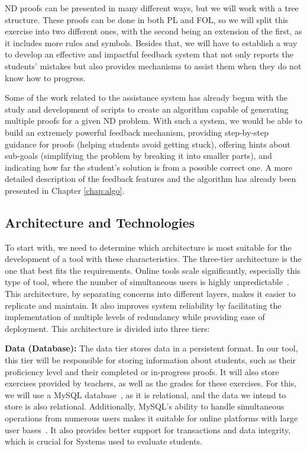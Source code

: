 \gls{ND} proofs can be presented in many different ways, but we will work with a tree structure. These proofs can be done in both \gls{PL} and \gls{FOL}, so we will split this exercise into two different ones, with the second being an extension of the first, as it includes more rules and symbols. Besides that, we will have to establish a way to develop an effective and impactful feedback system that not only reports the students' mistakes but also provides mechanisms to assist them when they do not know how to progress. 

Some of the work related to the assistance system has already begun with the study and development of scripts to create an algorithm capable of generating multiple proofs for a given \gls{ND} problem. With such a system, we would be able to build an extremely powerful feedback mechanism, providing step-by-step guidance for proofs (helping students avoid getting stuck), offering hints about sub-goals (simplifying the problem by breaking it into smaller parts), and indicating how far the student's solution is from a possible correct one. A more detailed description of the feedback features and the algorithm has already been presented in Chapter \ref{chap:algo}.

\subsection{Architecture and Technologies}
To start with, we need to determine which architecture is most suitable for the development of a tool with these characteristics. The three-tier architecture is the one that best fits the requirements. Online tools scale significantly, especially this type of tool, where the number of simultaneous users is highly unpredictable~\cite{kircher_2025_the}. This architecture, by separating concerns into different layers, makes it easier to replicate and maintain. It also improves system reliability by facilitating the implementation of multiple levels of redundancy while providing ease of deployment. This architecture is divided into three tiers:

\textbf{Data (Database):} The data tier stores data in a persistent format. In our tool, this tier will be responsible for storing information about students, such as their proficiency level and their completed or in-progress proofs. It will also store exercises provided by teachers, as well as the grades for these exercises. For this, we will use a MySQL database~\cite{oracle_2024_mysql}, as it is relational, and the data we intend to store is also relational. Additionally, MySQL's ability to handle simultaneous operations from numerous users makes it suitable for online platforms with large user bases~\cite{gyordi_2016_a}. It also provides better support for transactions and data integrity, which is crucial for Systems used to evaluate students.
    

